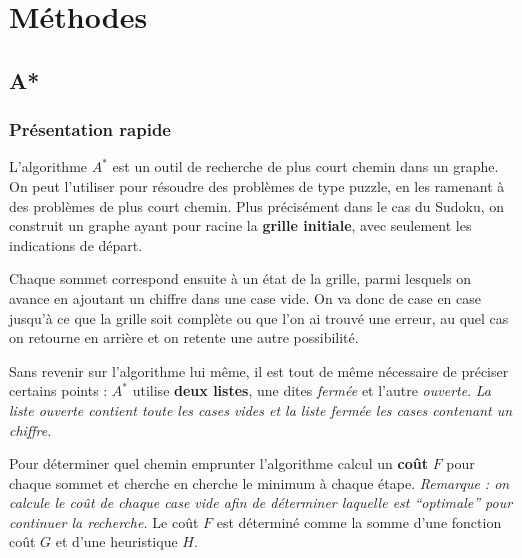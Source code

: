 \chapter{Méthodes}
    \section{A*}


\subsection{Présentation rapide}

L'algorithme $A^*$ est un outil de recherche de plus court chemin dans un graphe. On peut l'utiliser pour résoudre des problèmes de type puzzle, en les ramenant à des problèmes de plus court chemin. Plus précisément dans le cas du Sudoku, on construit un graphe ayant pour racine la \textbf{grille initiale}, avec seulement les indications de départ.

Chaque sommet correspond ensuite à un état de la grille, parmi lesquels on avance en ajoutant un chiffre dans une case vide. On va donc de case en case jusqu'à ce que la grille soit complète ou que l'on ai trouvé une erreur, au quel cas on retourne en arrière et on retente une autre possibilité.

\bigskip

Sans revenir sur l'algorithme lui même, il est tout de même nécessaire de préciser certains points : $A^*$ utilise \textbf{deux listes}, une dites \textit{fermée} et l'autre \textit{ouverte}. \textit{La liste ouverte contient toute les cases vides et la liste fermée les cases contenant un chiffre.}

Pour déterminer quel chemin emprunter l'algorithme calcul un \textbf{coût} $F$ pour chaque sommet et cherche en cherche le minimum à chaque étape. \textit{Remarque : on calcule le coût de chaque case vide afin de déterminer laquelle est ``optimale'' pour continuer la recherche.} Le coût $F$ est déterminé comme la somme d'une fonction coût $G$ et d'une heuristique $H$.

\bigskip


